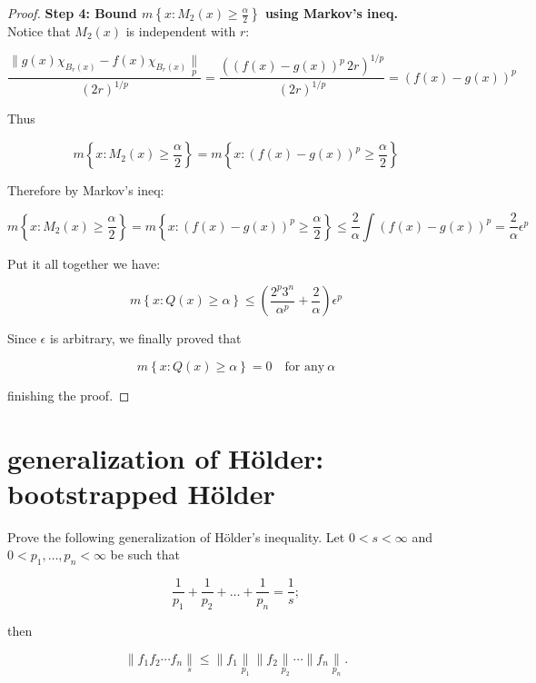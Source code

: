 \documentclass{qlnotes-export}
\begin{document}
\begin{proof}
\textbf{Step 4: Bound \(m\left\{ {x:M_{2}(x) \geq \frac{\alpha}{2}} \right\}\) using Markov's ineq.}\\
Notice that \(M_{2}(x)\) is independent with \(r\):

\[\frac{\parallel g(x)\chi_{B_{r}(x)} - f(x)\chi_{B_{r}(x)}\underset{p}{\parallel}}{(2r)^{1/p}} = \frac{((f(x) - g(x))^{p}\, 2r)^{1/p}}{(2r)^{1/p}} = (f(x) - g(x))^{p}\]

Thus

\[m\left\{ {x:M_{2}(x) \geq \frac{\alpha}{2}} \right\} = m\left\{ {x:(f(x) - g(x))^{p} \geq \frac{\alpha}{2}} \right\}\]

Therefore by Markov's ineq:

\[m\left\{ {x:M_{2}(x) \geq \frac{\alpha}{2}} \right\} = m\left\{ {x:(f(x) - g(x))^{p} \geq \frac{\alpha}{2}} \right\} \leq \frac{2}{\alpha}\int(f(x) - g(x))^{p} = \frac{2}{\alpha}\epsilon^{p}\]

Put it all together we have:

\[m\left\{ {x:Q(x) \geq \alpha} \right\} \leq (\frac{2^{p}3^{n}}{\alpha^{p}} + \frac{2}{\alpha})\epsilon^{p}\]

Since \(\epsilon\) is arbitrary, we finally proved that

\[m\left\{ {x:Q(x) \geq \alpha} \right\} = 0\quad\text{for any}\ \alpha\]

finishing the proof.

\end{proof}

\section{\texorpdfstring{\textbf{generalization of Hölder}: bootstrapped Hölder}{generalization of Hölder: bootstrapped Hölder}}\label{generalization-of-huxf6lder-bootstrapped-huxf6lder}

Prove the following generalization of Hölder's inequality. Let \(0 < s < \infty\) and \(0 < p_{1},\ldots,p_{n} < \infty\) be such that

\[\frac{1}{p_{1}} + \frac{1}{p_{2}} + \ldots + \frac{1}{p_{n}} = \frac{1}{s};\]

then

\[\parallel f_{1}f_{2}\cdots f_{n}\underset{s}{\parallel} \leq \parallel f_{1}\underset{p_{1}}{\parallel} \parallel f_{2}\underset{p_{2}}{\parallel}\cdots \parallel f_{n}\underset{p_{n}}{\parallel}.\]
\end{document}
